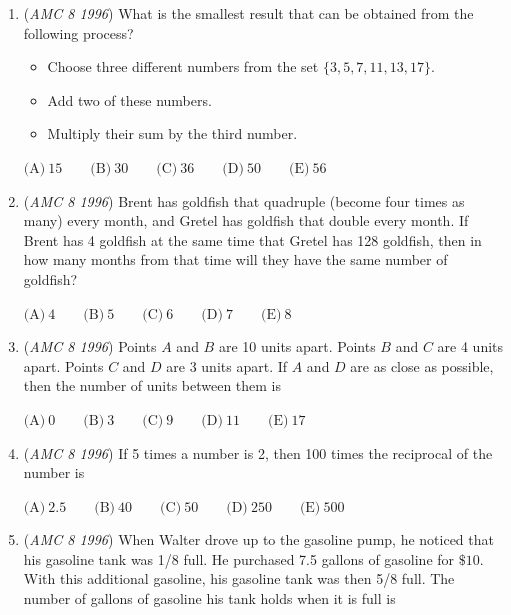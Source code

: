 \begin{enumerate}
 Which of the following expressions represents a negative number?


 $\text{(A)}\ P-Q \qquad \text{(B)}\ P\cdot Q \qquad \text{(C)}\ \dfrac{S}{Q}\cdot P \qquad \text{(D)}\ \dfrac{R}{P\cdot Q} \qquad \text{(E)}\ \dfrac{S+T}{R}$


	\item (\textit{AMC 8 1996}) What is the smallest result that can be obtained from the following process?


 
            \begin{itemize}
        \item Choose three different numbers from the set $\{3,5,7,11,13,17\}$.

        \item Add two of these numbers.

        \item Multiply their sum by the third number.
            \end{itemize}
            $\text{(A)}\ 15 \qquad \text{(B)}\ 30 \qquad \text{(C)}\ 36 \qquad \text{(D)}\ 50 \qquad \text{(E)}\ 56$


	\item (\textit{AMC 8 1996}) Brent has goldfish that quadruple (become four times as many) every month, and Gretel has goldfish that double every month.  If Brent has 4 goldfish at the same time that Gretel has 128 goldfish, then in how many months from that time will they have the same number of goldfish?


 $\text{(A)}\ 4 \qquad \text{(B)}\ 5 \qquad \text{(C)}\ 6 \qquad \text{(D)}\ 7 \qquad \text{(E)}\ 8$


	\item (\textit{AMC 8 1996}) Points $A$ and $B$ are 10 units apart.  Points $B$ and $C$ are 4 units apart.  Points $C$ and $D$ are 3 units apart.  If $A$ and $D$ are as close as possible, then the number of units between them is


 $\text{(A)}\ 0 \qquad \text{(B)}\ 3 \qquad \text{(C)}\ 9 \qquad \text{(D)}\ 11 \qquad \text{(E)}\ 17$


	\item (\textit{AMC 8 1996}) If 5 times a number is 2, then 100 times the reciprocal of the number is


 $\text{(A)}\ 2.5 \qquad \text{(B)}\ 40 \qquad \text{(C)}\ 50 \qquad \text{(D)}\ 250 \qquad \text{(E)}\ 500$


	\item (\textit{AMC 8 1996}) When Walter drove up to the gasoline pump, he noticed that his gasoline tank was 1/8 full.  He purchased 7.5 gallons of gasoline for $\$10$.  With this additional gasoline, his gasoline tank was then 5/8 full.  The number of gallons of gasoline his tank holds when it is full is



\end{enumerate}
